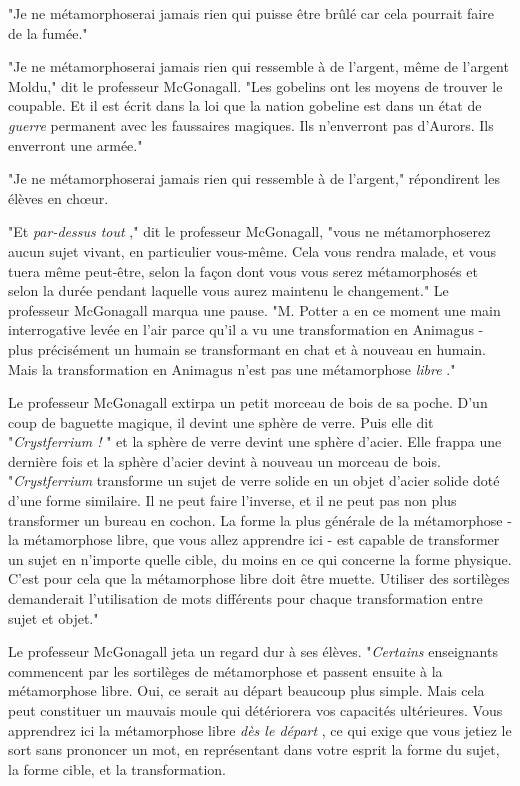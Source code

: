 "Je ne métamorphoserai jamais rien qui puisse être brûlé car cela pourrait faire de la fumée."

"Je ne métamorphoserai jamais rien qui ressemble à de l'argent, même de l'argent Moldu," dit le professeur McGonagall. "Les gobelins ont les moyens de trouver le coupable. Et il est écrit dans la loi que la nation gobeline est dans un état de \emph{guerre}  permanent avec les faussaires magiques. Ils n'enverront pas d'Aurors. Ils enverront une armée."

"Je ne métamorphoserai jamais rien qui ressemble à de l'argent," répondirent les élèves en chœur.

"Et \emph{par-dessus tout} ," dit le professeur McGonagall, "vous ne métamorphoserez aucun sujet vivant, en particulier vous-même. Cela vous rendra malade, et vous tuera même peut-être, selon la façon dont vous vous serez métamorphosés et selon la durée pendant laquelle vous aurez maintenu le changement." Le professeur McGonagall marqua une pause. "M. Potter a en ce moment une main interrogative levée en l'air parce qu'il a vu une transformation en Animagus - plus précisément un humain se transformant en chat et à nouveau en humain. Mais la transformation en Animagus n'est pas une métamorphose \emph{libre} ."

Le professeur McGonagall extirpa un petit morceau de bois de sa poche. D'un coup de baguette magique, il devint une sphère de verre. Puis elle dit "\emph{Crystferrium !} " et la sphère de verre devint une sphère d'acier. Elle frappa une dernière fois et la sphère d'acier devint à nouveau un morceau de bois. "\emph{Crystferrium}  transforme un sujet de verre solide en un objet d'acier solide doté d'une forme similaire. Il ne peut faire l'inverse, et il ne peut pas non plus transformer un bureau en cochon. La forme la plus générale de la métamorphose - la métamorphose libre, que vous allez apprendre ici - est capable de transformer un sujet en n'importe quelle cible, du moins en ce qui concerne la forme physique. C'est pour cela que la métamorphose libre doit être muette. Utiliser des sortilèges demanderait l'utilisation de mots différents pour chaque transformation entre sujet et objet."

Le professeur McGonagall jeta un regard dur à ses élèves. "\emph{Certains}  enseignants commencent par les sortilèges de métamorphose et passent ensuite à la métamorphose libre. Oui, ce serait au départ beaucoup plus simple. Mais cela peut constituer un mauvais moule qui détériorera vos capacités ultérieures. Vous apprendrez ici la métamorphose libre \emph{dès le départ} , ce qui exige que vous jetiez le sort sans prononcer un mot, en représentant dans votre esprit la forme du sujet, la forme cible, et la transformation.

